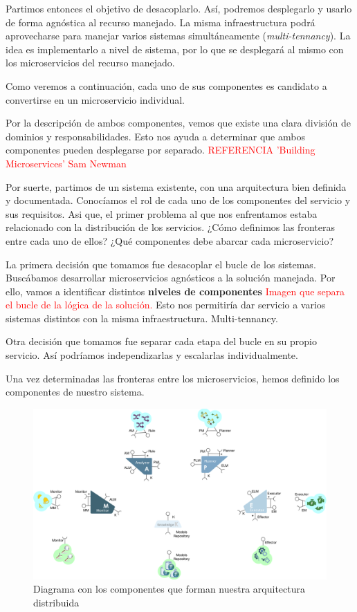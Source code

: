 Partimos entonces el objetivo de desacoplarlo. Así, podremos desplegarlo y usarlo de forma agnóstica al recurso manejado. La misma infraestructura podrá aprovecharse para manejar varios sistemas simultáneamente (\emph{multi-tennancy}). La idea es implementarlo a nivel de sistema\cite{mendoncaGeneralityVsReusability2018}, por lo que se desplegará al mismo con los microservicios del recurso manejado.

Como veremos a continuación, cada uno de sus componentes es candidato a convertirse en un microservicio individual.

Por la descripción de ambos componentes, vemos que existe una clara división de dominios y responsabilidades. Esto nos ayuda a determinar que ambos componentes pueden desplegarse por separado. \textcolor{red}{REFERENCIA 'Building Microservices' Sam Newman}

Por suerte, partimos de un sistema existente, con una arquitectura bien definida y documentada. Conocíamos el rol de cada uno de los componentes del servicio y sus requisitos. Asi que, el primer problema al que nos enfrentamos estaba relacionado con la distribución de los servicios. ¿Cómo definimos las fronteras entre cada uno de ellos? ¿Qué componentes debe abarcar cada microservicio?

La primera decisión que tomamos fue desacoplar el bucle de los sistemas. Buscábamos desarrollar microservicios agnósticos a la solución manejada. Por ello, vamos a identificar distintos \textbf{niveles de componentes} \textcolor{red}{Imagen que separa el bucle de la lógica de la solución.} Esto nos permitiría dar servicio a varios sistemas distintos con la misma infraestructura. Multi-tennancy.

Otra decisión que tomamos fue separar cada etapa del bucle en su propio servicio. Así podríamos independizarlas y escalarlas individualmente.

Una vez determinadas las fronteras entre los microservicios, hemos definido los componentes de nuestro sistema.

\begin{figure}[htb]
  \centering
  \includegraphics[scale=0.3]{03_arquitectura/images/mape-k-microservices}
  \caption{Diagrama con los componentes que forman nuestra arquitectura distribuida}
  \label{fig:mape-k-microservices}
\end{figure}


